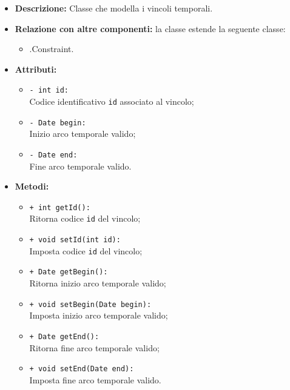 \begin{flushleft}
\begin{itemize}
\item \textbf{Descrizione:} Classe che modella i vincoli temporali.
\item \textbf{Relazione con altre componenti:} la classe estende la seguente classe:
		\begin{itemize}
			\item \smodel{}.Constraint.
		\end{itemize}
\item \textbf{Attributi:}
\begin{sloppypar}
\begin{itemize}
\item \texttt{- int id:}\\ Codice identificativo \texttt{id} associato al vincolo;
\item \texttt{- Date begin:}\\ Inizio arco temporale valido;
\item \texttt{- Date end:}\\ Fine arco temporale valido.
\end{itemize}
\end{sloppypar}
\item \textbf{Metodi:}
\begin{sloppypar}
\begin{itemize}
\item \texttt{+ int getId():}\\ Ritorna codice \texttt{id} del vincolo;
\item \texttt{+ void setId(int id):}\\ Imposta codice \texttt{id} del vincolo;
\item \texttt{+ Date getBegin():}\\ Ritorna inizio arco temporale valido;
\item \texttt{+ void setBegin(Date begin):}\\ Imposta inizio arco temporale valido;
\item \texttt{+ Date getEnd():}\\ Ritorna fine arco temporale valido;
\item \texttt{+ void setEnd(Date end):}\\ Imposta fine arco temporale valido.
\end{itemize}
\end{sloppypar}
\end{itemize}
\end{flushleft}

